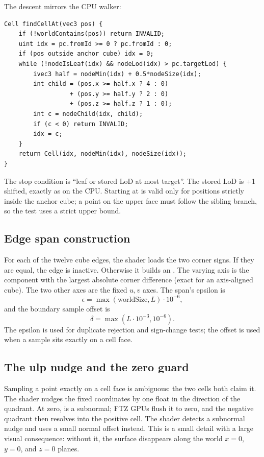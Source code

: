 The descent mirrors the CPU walker:
\begin{lstlisting}[style=glsl,caption={The root-to-cell descent.},label={lst:findcell}]
Cell findCellAt(vec3 pos) {
    if (!worldContains(pos)) return INVALID;
    uint idx = pc.fromId >= 0 ? pc.fromId : 0;
    if (pos outside anchor cube) idx = 0;
    while (!nodeIsLeaf(idx) && nodeLod(idx) > pc.targetLod) {
        ivec3 half = nodeMin(idx) + 0.5*nodeSize(idx);
        int child = (pos.x >= half.x ? 4 : 0)
                  + (pos.y >= half.y ? 2 : 0)
                  + (pos.z >= half.z ? 1 : 0);
        int c = nodeChild(idx, child);
        if (c < 0) return INVALID;
        idx = c;
    }
    return Cell(idx, nodeMin(idx), nodeSize(idx));
}
\end{lstlisting}
The stop condition is ``leaf or stored LoD at most target''.  The stored
LoD is +1 shifted, exactly as on the CPU.  Starting at  is
valid only for positions strictly inside the anchor cube; a point on the
upper face must follow the sibling branch, so the test uses a strict upper
bound.

\subsection{Edge span construction}

For each of the twelve cube edges, the shader loads the two corner signs.
If they are equal, the edge is inactive.  Otherwise it builds an
.  The varying axis is the component with the largest
absolute corner difference (exact for an axis-aligned cube).  The two other
axes are the fixed $u,v$ axes.  The span's epsilon is
\begin{equation}
  \epsilon = \max(\text{worldSize}, L)\cdot10^{-6},
\end{equation}
and the boundary sample offset is
\begin{equation}
  \delta = \max(L\cdot10^{-3},10^{-6}).
\end{equation}
The epsilon is used for duplicate rejection and sign-change tests; the
offset is used when a sample sits exactly on a cell face.

\subsection{The ulp nudge and the zero guard}

Sampling a point exactly on a cell face is ambiguous: the two cells both
claim it.  The shader nudges the fixed coordinates by one float in the
direction of the quadrant.  At zero,  is a
subnormal; FTZ GPUs flush it to zero, and the negative quadrant then
resolves into the positive cell.  The shader detects a subnormal nudge and
uses a small normal offset instead.  This is a small detail with a large
visual consequence: without it, the surface disappears along the world
$x=0$, $y=0$, and $z=0$ planes.

